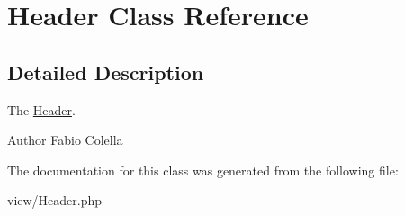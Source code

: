 \hypertarget{classHeader}{\section{Header Class Reference}
\label{classHeader}
}


\subsection{Detailed Description}
The \hyperlink{classHeader}{Header}.

\begin{DoxyAuthor}{Author}
Fabio Colella 
\end{DoxyAuthor}


The documentation for this class was generated from the following file\+:\begin{DoxyCompactItemize}
\item 
view/Header.\+php\end{DoxyCompactItemize}
